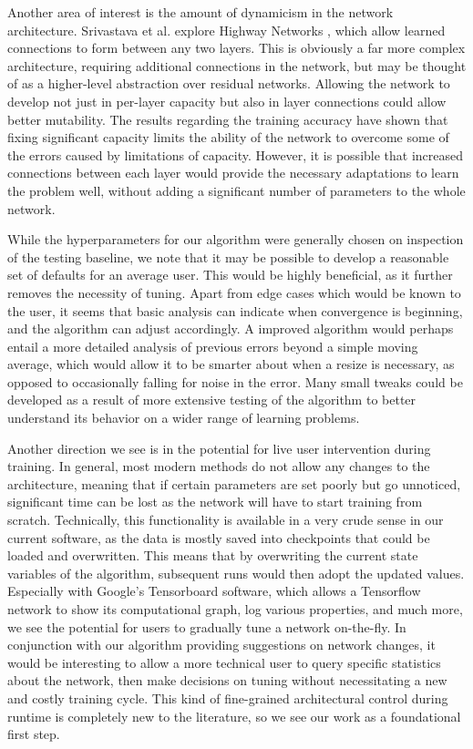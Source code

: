Another area of interest is the amount of dynamicism in the network architecture.
Srivastava et al. explore Highway Networks \cite{srivastava2015highway}, which allow learned connections to form between any two layers.
This is obviously a far more complex architecture, requiring additional connections in the network, but may be thought of as a higher-level abstraction over residual networks.
Allowing the network to develop not just in per-layer capacity but also in layer connections could allow better mutability.
The results regarding the training accuracy have shown that fixing significant capacity limits the ability of the network to overcome some of the errors caused by limitations of capacity.
However, it is possible that increased connections between each layer would provide the necessary adaptations to learn the problem well, without adding a significant number of parameters to the whole network.

While the hyperparameters for our algorithm were generally chosen on inspection of the testing baseline, we note that it may be possible to develop a reasonable set of defaults for an average user.
This would be highly beneficial, as it further removes the necessity of tuning.
Apart from edge cases which would be known to the user, it seems that basic analysis can indicate when convergence is beginning, and the algorithm can adjust accordingly.
A improved algorithm would perhaps entail a more detailed analysis of previous errors beyond a simple moving average, which would allow it to be smarter about when a resize is necessary, as opposed to occasionally falling for noise in the error.
Many small tweaks could be developed as a result of more extensive testing of the algorithm to better understand its behavior on a wider range of learning problems.

Another direction we see is in the potential for live user intervention during training.
In general, most modern methods do not allow any changes to the architecture, meaning that if certain parameters are set poorly but go unnoticed, significant time can be lost as the network will have to start training from scratch.
Technically, this functionality is available in a very crude sense in our current software, as the data is mostly saved into checkpoints that could be loaded and overwritten.
This means that by overwriting the current state variables of the algorithm, subsequent runs would then adopt the updated values.
Especially with Google's Tensorboard software, which allows a Tensorflow network to show its computational graph, log various properties, and much more, we see the potential for users to gradually tune a network on-the-fly.
In conjunction with our algorithm providing suggestions on network changes, it would be interesting to allow a more technical user to query specific statistics about the network, then make decisions on tuning without necessitating a new and costly training cycle.
This kind of fine-grained architectural control during runtime is completely new to the literature, so we see our work as a foundational first step.